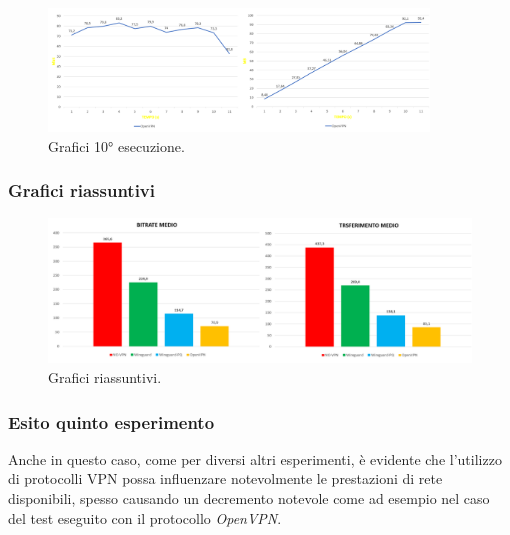 \begin{figure}[h] \includegraphics[width=0.9\textwidth] {Tesi magistrale/capitoli/images/64.png}
\centering
\caption{Grafici 10° esecuzione.}
\end{figure}

\newpage
\subsubsection{Grafici riassuntivi}

\begin{figure}[h] \includegraphics[width=1\textwidth] {Tesi magistrale/capitoli/images/65.png}
\centering
\caption{Grafici riassuntivi.}
\end{figure}

\subsubsection{Esito quinto esperimento}
Anche in questo caso, come per diversi altri esperimenti, è evidente che l'utilizzo di protocolli VPN possa influenzare 
notevolmente le prestazioni di rete disponibili, spesso causando un decremento notevole come ad esempio nel caso del test eseguito con il protocollo \emph{OpenVPN}.